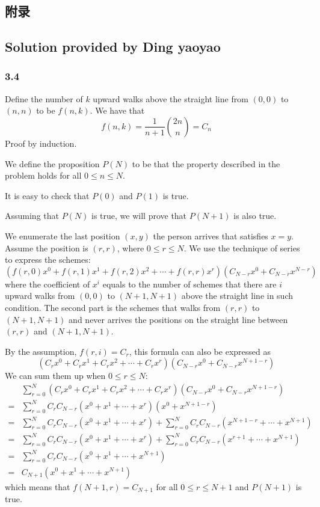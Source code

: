 \begin{appendix}
	\section{附录}
		\subsection{Solution provided by Ding yaoyao}
			\subsubsection{3.4}
				Define the number of $k$ upward walks above the straight line from $(0,0)$ to $(n,n)$ to be $f(n,k)$. We have that
				$$
					f(n,k) = \frac{1}{n+1}\binom{2n}{n} = C_n
				$$
		\proof
			Proof by induction.

			We define the proposition $P(N)$ to be that the property described in the problem holds for all $0 \leq n \leq N$.

			It is easy to check that $P(0)$ and $P(1)$ is true.

			Assuming that $P(N)$ is true, we will prove that $P(N+1)$ is also true.

			We enumerate the last position $(x,y)$ the person arrives that satisfies $x = y$. Assume the position is $(r,r)$, where $0 \leq r \leq N$. We use the technique of series to express the schemes:
			$$
				(f(r,0)x^0+f(r,1)x^1+f(r,2)x^2+\cdots +f(r,r)x^r)(C_{N-r}x^0 + C_{N-r}x^{N-r})
			$$
			\indent where the coefficient of $x^i$ equals to the number of schemes that there are $i$ upward walks from $(0,0)$ to $(N+1,N+1)$ above the straight line in such condition. The second part is the schemes that walks from $(r,r)$ to $(N+1,N+1)$ and never arrives the positions on the straight line between $(r,r)$ and $(N+1,N+1)$.

			By the assumption, $f(r,i) = C_r$, this formula can also be expressed as
			$$
				(C_rx^0+C_rx^1+C_rx^2+\cdots +C_rx^r)(C_{N-r}x^0 + C_{N-r}x^{N+1-r})
			$$
			We can sum them up when $0 \leq r \leq N$:
			\[
			\begin{split}
			 & \sum_{r = 0}^{N}(C_rx^0+C_rx^1+C_rx^2+\cdots +C_rx^r)(C_{N-r}x^0 + C_{N-r}x^{N+1-r}) \\
			=& \sum_{r = 0}^{N}C_rC_{N-r}(x^0+x^1+\cdots+x^r)(x^0+x^{N+1-r}) \\
			=& \sum_{r = 0}^{N}C_rC_{N-r}(x^0+x^1+\cdots+x^r) + \sum_{r = 0}^{N}C_rC_{N-r}(x^{N+1-r}+\cdots+x^{N+1}) \\
			=& \sum_{r = 0}^{N}C_rC_{N-r}(x^0+x^1+\cdots+x^r) + \sum_{r = 0}^{N}C_rC_{N-r}(x^{r+1}+\cdots+x^{N+1}) \\
			=& \sum_{r = 0}^{N}C_rC_{N-r}(x^0+x^1+\cdots+x^{N+1}) \\
			=& C_{N+1}(x^0+x^1+\cdots+x^{N+1})
			\end{split}
			\]
			which means that $f(N+1,r) = C_{N+1}$ for all $0 \leq r \leq N+1$ and $P(N+1)$ is true.


\end{appendix}
